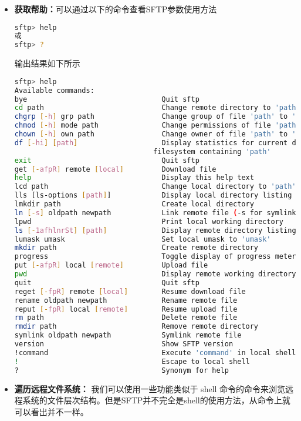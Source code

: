\documentclass[lang=cn,a4paper,newtx]{elegantpaper}
\begin{document}
\begin{itemize}
  \item \textbf{获取帮助：}可以通过以下的命令查看SFTP参数使用方法
  \begin{lstlisting}[language=bash]
sftp> help
或
sftp> ?
  \end{lstlisting}
  输出结果如下所示
  \begin{lstlisting}[language=bash]
sftp> help
Available commands:
bye                                Quit sftp
cd path                            Change remote directory to 'path'
chgrp [-h] grp path                Change group of file 'path' to 'grp'
chmod [-h] mode path               Change permissions of file 'path' to 'mode'
chown [-h] own path                Change owner of file 'path' to 'own'
df [-hi] [path]                    Display statistics for current directory or
                                 filesystem containing 'path'
exit                               Quit sftp
get [-afpR] remote [local]         Download file
help                               Display this help text
lcd path                           Change local directory to 'path'
lls [ls-options [path]]            Display local directory listing
lmkdir path                        Create local directory
ln [-s] oldpath newpath            Link remote file (-s for symlink)
lpwd                               Print local working directory
ls [-1afhlnrSt] [path]             Display remote directory listing
lumask umask                       Set local umask to 'umask'
mkdir path                         Create remote directory
progress                           Toggle display of progress meter
put [-afpR] local [remote]         Upload file
pwd                                Display remote working directory
quit                               Quit sftp
reget [-fpR] remote [local]        Resume download file
rename oldpath newpath             Rename remote file
reput [-fpR] local [remote]        Resume upload file
rm path                            Delete remote file
rmdir path                         Remove remote directory
symlink oldpath newpath            Symlink remote file
version                            Show SFTP version
!command                           Execute 'command' in local shell
!                                  Escape to local shell
?                                  Synonym for help
  \end{lstlisting}
  \item \textbf{遍历远程文件系统：}
  我们可以使用一些功能类似于 shell 命令的命令来浏览远程系统的文件层次结构。但是SFTP并不完全是shell的使用方法，从命令上就可以看出并不一样。
  

\end{itemize}
\end{document}
